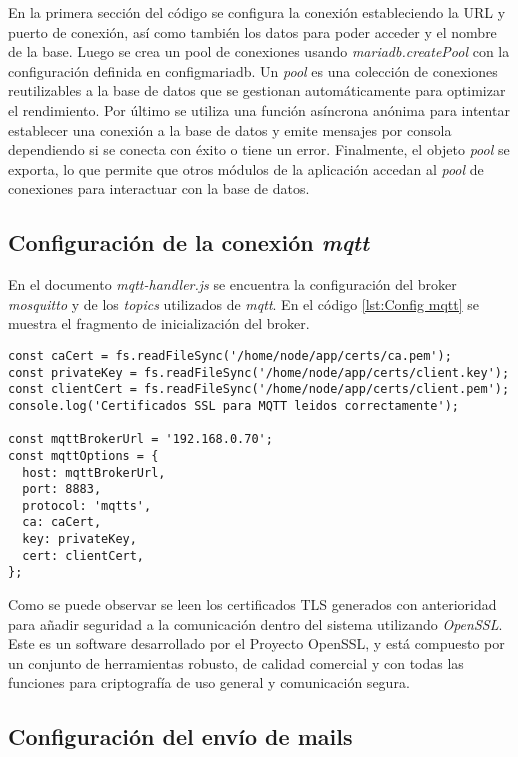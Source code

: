En la primera sección del código se configura la conexión estableciendo la URL y puerto de conexión, así como también los datos para poder acceder y el nombre de la base. Luego se crea un pool de conexiones usando \textit{mariadb.createPool} con la configuración definida en configmariadb. Un \textit{pool} es una colección de conexiones reutilizables a la base de datos que se gestionan automáticamente para optimizar el rendimiento. Por último se utiliza una función asíncrona anónima para intentar establecer una conexión a la base de datos y emite mensajes por consola dependiendo si se conecta con éxito o tiene un error. Finalmente, el objeto \textit{pool} se exporta, lo que permite que otros módulos de la aplicación accedan al \textit{pool} de conexiones para interactuar con la base de datos.

\subsection{Configuración de la conexión \textit{mqtt}}

En el documento \textit{mqtt-handler.js} se encuentra la configuración del broker \textit{mosquitto} y de los \textit{topics} utilizados de \textit{mqtt}. En el código \ref{lst:Config mqtt} se muestra el fragmento de inicialización del broker.

\begin{lstlisting}[caption={Inicialización del broker \textit{mqtt}}, label={lst:Config mqtt}]
const caCert = fs.readFileSync('/home/node/app/certs/ca.pem');
const privateKey = fs.readFileSync('/home/node/app/certs/client.key');
const clientCert = fs.readFileSync('/home/node/app/certs/client.pem');
console.log('Certificados SSL para MQTT leidos correctamente');

const mqttBrokerUrl = '192.168.0.70';
const mqttOptions = {
  host: mqttBrokerUrl,
  port: 8883,
  protocol: 'mqtts',
  ca: caCert,
  key: privateKey,
  cert: clientCert,
};
\end{lstlisting}

Como se puede observar se leen los certificados TLS generados con anterioridad para añadir seguridad a la comunicación dentro del sistema utilizando \textit{OpenSSL}. Este es un software desarrollado por el Proyecto OpenSSL, y está compuesto por un conjunto de herramientas robusto, de calidad comercial y con todas las funciones para criptografía de uso general y comunicación segura.\citep{25}

\subsection{Configuración del envío de mails}

